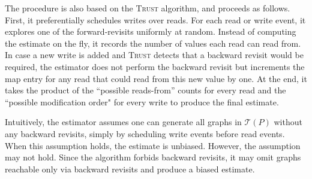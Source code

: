 \documentclass[acmsmall]{acmart}
\newcommand{\trust}{\textsc{Trust}\xspace}
\begin{document}
%

The procedure is also based on the \trust algorithm, and proceeds as follows.
First, it preferentially schedules writes over reads.
For each read or write event, it explores one of the forward-revisits uniformly at random. 
Instead of computing the estimate on the fly, it records the number of values each read can read from. 
In case a new write is added and \trust detects that a backward revisit would be required, the estimator
does not perform the backward revisit but increments the map entry for any read that could read from this new value by one. 
At the end, it takes the product of the ``possible reads-from'' counts for every read and the ``possible modification order" 
for every write to produce the final estimate.

Intuitively, the estimator assumes one can generate all graphs in $\mathcal{T}(P)$ 
without any backward revisits, simply by scheduling write events before read events.
When this assumption holds, the estimate is unbiased. 
However, the assumption may not hold. 
Since the algorithm forbids backward revisits, it may omit graphs 
reachable only via backward revisits and produce a biased estimate.
\end{document}
